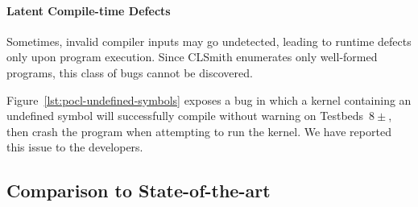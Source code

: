 \paragraph{Latent Compile-time Defects} Sometimes, invalid compiler inputs may go undetected, leading to runtime defects only upon program execution. Since CLSmith enumerates only well-formed programs, this class of bugs cannot be discovered.

Figure~\ref{lst:pocl-undefined-symbols} exposes a bug in which a kernel containing an undefined symbol will successfully compile without warning on Testbeds~$8\pm$, then crash the program when attempting to run the kernel. We have reported this issue to the developers.

%
%
%
%
%


\subsection{Comparison to State-of-the-art}%
\label{subsec:vs_clsmith}

